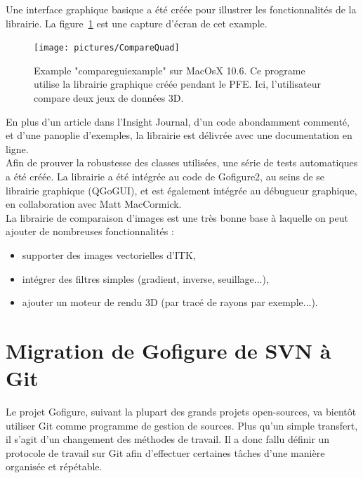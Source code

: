 Une interface graphique basique a été créée pour illustrer les fonctionnalités de la librairie. La figure~\ref{fig:CompareQuad} est une capture d'écran de cet example.\\
\begin{figure}[h]
\center
\texttt{[image: pictures/CompareQuad]}
\caption{Example "compareguiexample" sur MacOsX 10.6. Ce programe utilise la librairie graphique créée pendant le PFE. Ici, l'utilisateur compare deux jeux de données 3D.}
\label{fig:CompareQuad}
\end{figure}

En plus d'un article dans l'Insight Journal, d'un code abondamment commenté, et d'une panoplie d'exemples,
la librairie est délivrée avec une documentation en ligne.\\

Afin de prouver la robustesse des classes utilisées, une série de tests automatiques a été créée.
La librairie a été intégrée au code de Gofigure2, au seins de se librairie graphique (QGoGUI), et est également intégrée au débugueur graphique, en collaboration avec Matt MacCormick.\\

La librairie de comparaison d'images est une très bonne base à laquelle on peut ajouter de nombreuses fonctionnalités :
\begin{itemize}
  \item supporter des images vectorielles d'ITK,
  \item intégrer des filtres simples (gradient, inverse, seuillage...),
  \item ajouter un moteur de rendu 3D (par tracé de rayons par exemple...).
\end{itemize}








\section{Migration de Gofigure de SVN à Git}

Le projet Gofigure, suivant la plupart des grands projets open-sources, va bientôt utiliser Git comme programme de gestion de sources.
Plus qu'un simple transfert, il s'agit d'un changement des méthodes de travail.
Il a donc fallu définir un protocole de travail sur Git 
afin d'effectuer certaines tâches d'une manière organisée et répétable. 

